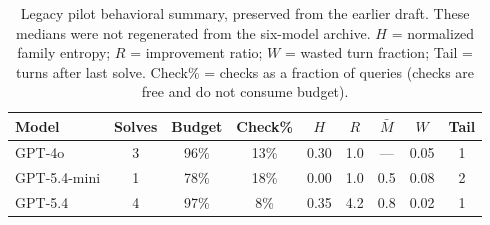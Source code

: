 \begin{table}[htbp]
\centering
\caption{Legacy pilot behavioral summary, preserved from the earlier draft. These medians were not regenerated from the six-model archive.
$H$ = normalized family entropy; $R$ = improvement ratio; $W$ = wasted
turn fraction; Tail = turns after last solve.  Check\% = checks as a
fraction of queries (checks are free and do not consume budget).}\label{tab:pilotbehavior}
\scriptsize
\setlength{\tabcolsep}{4pt}
\begin{tabular}{lcccccccc}
\toprule
\textbf{Model} & \textbf{Solves} & \textbf{Budget} & \textbf{Check\%}
    & $H$ & $R$ & $\bar M$ & $W$ & \textbf{Tail} \\
\midrule
GPT-4o       & 3   & 96\%  & 13\% & 0.30 & 1.0 & --- & 0.05 & 1 \\
GPT-5.4-mini & 1   & 78\%  & 18\% & 0.00 & 1.0 & 0.5 & 0.08 & 2 \\
GPT-5.4      & 4   & 97\%  & 8\%  & 0.35 & 4.2 & 0.8 & 0.02 & 1 \\
\bottomrule
\end{tabular}
\end{table}

